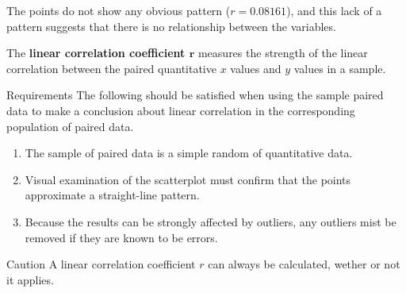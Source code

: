 \documentclass{beamer}
\begin{document}
\begin{frame}
\begin{example}
\begin{center}
\end{center}\pause
The points do not show any obvious pattern ($r=0.08161$), and this lack of a pattern suggests that there is no relationship between the variables.
\end{example}
\end{frame}

\begin{frame}
\begin{definition}
The \textbf{linear correlation coefficient $\boldsymbol{r}$} measures the strength of the linear correlation between the paired quantitative $x$ values and $y$ values in a sample.
\end{definition}\pause

\begin{block}{Requirements}
The following should be satisfied when using the sample paired data to make a conclusion about linear correlation in the corresponding population of paired data.
\begin{enumerate}
\item The sample of paired data is a simple random of quantitative data.\pause
\item Visual examination of the scatterplot must confirm that the points approximate a straight-line pattern.\pause
\item Because the results can be strongly affected by outliers, any outliers mist be removed if they are known to be errors.
\end{enumerate}
\end{block}\pause

\begin{block}{Caution}\small
A linear correlation coefficient $r$ can always be calculated, wether or not it applies.
\end{block}
\end{frame}
\end{document}
